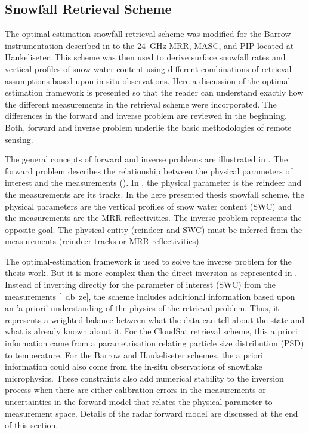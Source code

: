 
\subsection{Snowfall Retrieval Scheme}\label{sec:ret_scheme}

The optimal-estimation snowfall retrieval scheme was modified for the Barrow instrumentation described in \citet{cooper_variational_2017} to the \SI{24}{\giga\hertz} MRR, MASC, and PIP located at Haukeliseter. This scheme was then used to derive surface snowfall rates and vertical profiles of snow water content using different combinations of retrieval assumptions based upon in-situ observations.
Here a discussion of the optimal-estimation framework is presented so that the reader can understand exactly how the different measurements in the retrieval scheme were incorporated. The differences in the forward and inverse problem are reviewed in the beginning. Both, forward and inverse problem underlie the basic methodologies of remote sensing.
\par\medskip\noindent
The general concepts of forward and inverse problems are illustrated in .  The forward problem describes the relationship between the physical parameters of interest and the measurements (). In , the physical parameter is the reindeer and the measurements are its tracks. In the here presented thesis snowfall scheme, the physical parameters are the vertical profiles of snow water content (SWC) and the measurements are the MRR reflectivities.  The inverse problem represents the opposite goal.  The physical entity (reindeer and SWC) must be inferred from the measurements (reindeer tracks or MRR reflectivities).
\par\medskip\noindent
The optimal-estimation framework is used to solve the inverse problem for the thesis work. But it is more complex than the direct inversion as represented in . Instead of inverting directly for the parameter of interest (SWC) from the measurements [\SI{}{\decibel ze}], the scheme includes additional information based upon an 'a priori' understanding of the physics of the retrieval problem. Thus, it represents a weighted balance between what the data can tell about the state and what is already known about it. For the CloudSat retrieval scheme, this a priori information came from a parametrisation relating particle size distribution (PSD) to temperature. For the Barrow and Haukeliseter schemes, the a priori information could also come from the in-situ observations of snowflake microphysics. These constraints also add numerical stability to the inversion process when there are either calibration errors in the measurements or uncertainties in the forward model that relates the physical parameter to measurement space. Details of the radar forward model are discussed at the end of this section.
